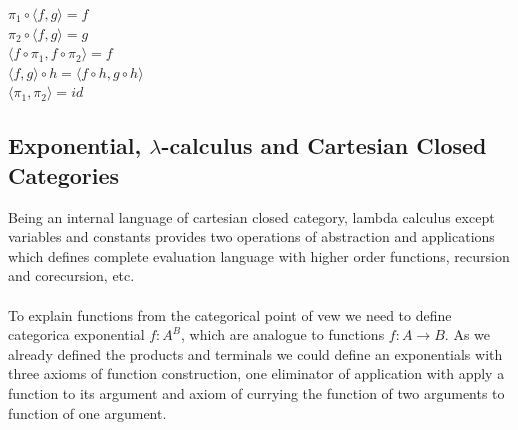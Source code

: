 \documentclass[11pt,oneside]{article}
\begin{document}
\begin{center}
$\pi_1 \circ \langle f, g \rangle = f$\\
$\pi_2 \circ \langle f, g \rangle = g$\\
$\langle f \circ \pi_1, f \circ \pi_2 \rangle = f$\\
$\langle f, g \rangle \circ h = \langle f \circ h, g \circ h \rangle$\\
$\langle \pi_1, \pi_2 \rangle = id$\\
\end{center}

\newpage
   \subsection{Exponential, $\lambda$-calculus and Cartesian Closed Categories}
   Being an internal language of cartesian closed category, lambda calculus except variables and constants
   provides two operations of abstraction and applications which defines complete evaluation language
   with higher order functions, recursion and corecursion, etc.

   \paragraph{}
   To explain functions from the categorical point of vew we need to define categorica exponential
   $f: A^B$, which are analogue to functions $f: A \rightarrow B$.
   As we already defined the products and terminals we could define an exponentials with three
   axioms of function construction, one eliminator of application with apply a function to its argument
   and axiom of currying the function of two arguments to function of one argument.
\end{document}
